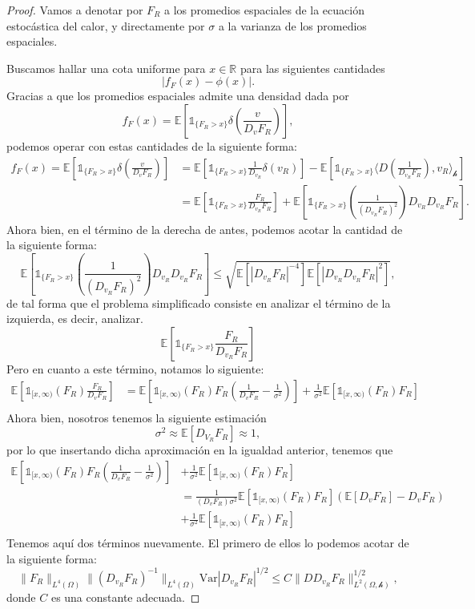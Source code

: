\documentclass[letterpaper,twoside,12pt]{book}
\newcommand{\R}{\mathbb{R}}
\newcommand{\E}{\mathbb{E}}
\newcommand{\1}{\mathds{1}}
\newcommand{\abs}[1]{\left\lvert #1 \right\rvert}
\theoremstyle{definition}
\theoremstyle{definition}
\theoremstyle{definition}
\theoremstyle{definition}
\theoremstyle{definition}
\theoremstyle{definition}
\theoremstyle{definition}
\begin{document}
\begin{proof} 
   Vamos a denotar por $F_R$ a los promedios espaciales de la ecuación estocástica del calor, y directamente por $\sigma$ a la varianza de los promedios espaciales.

   Buscamos hallar una cota uniforme para $x\in \R$ para las siguientes cantidades
   \[
   \abs{f_F(x)-\phi(x)}. 
   \]
   Gracias a que los promedios espaciales admite una densidad dada por 
   \[
   f_F(x)=\E\left[\1_{\{F_R>x\}}\delta(\frac{v}{D_vF_R})\right], 
   \]
   podemos operar con estas cantidades de la siguiente forma:
    \begin{align*}
    f_F(x)=\E\left[\1_{\{F_R>x\}}\delta(\frac{v}{D_vF_R})\right]&=\E\left[\1_{\{F_R>x\}}\frac{1}{D_{v_R}}\delta(v_R)\right]-\E\left[\1_{\{F_R>x\}}\langle D \left(\frac{1}{D_{v_R}F_R}\right),v_R\rangle_{\mathcal{h}}\right]\\
    &=\E\left[\1_{\{F_R>x\}}\frac{F_R}{D_{v_R}F_R}\right]+\E\left[\1_{\{F_R>x\}}\left(\frac{1}{\left(D_{v_R}F_R\right)^2}\right)D_{v_R}D_{v_R}F_R\right].
    \end{align*}
   Ahora bien, en el término de la derecha de antes, podemos acotar la cantidad de la siguiente forma:
   \[
    \E\left[\1_{\{F_R>x\}}\left(\frac{1}{\left(D_{v_R}F_R\right)^2}\right)D_{v_R}D_{v_R}F_R\right]\leq \sqrt{\E\left[\abs{D_{v_R}F_R}^{-4}\right]\E\left[\abs{D_{v_R}D_{v_R}F_R}^2\right]},
   \]
   de tal forma que el problema simplificado consiste en analizar el término de la izquierda, es decir, analizar.
   \[
    \E\left[\1_{\{F_R>x\}}\frac{F_R}{D_{v_R}F_R}\right] 
   \]
    Pero en cuanto a este término, notamos lo siguiente:
   \begin{align*}
    \E\left[\1_{[x,\infty)}(F_R)\frac{F_R}{D_vF_R}\right]&=\E\left[\1_{[x,\infty)}(F_R)F_R \left(\frac{1}{D_vF_R}-\frac{1}{\sigma^2}\right)\right] + \frac{1}{\sigma^2}\E\left[\1_{[x,\infty)}(F_R)F_R\right]\\
   \end{align*}
   Ahora bien, nosotros tenemos la siguiente estimación 
   \[
   \sigma^2\approx \E\left[D_{V_R}F_R\right]\approx 1,  
   \]
   por lo que insertando dicha aproximación en la igualdad anterior, tenemos que 
   \begin{align*}
    \E\left[\1_{[x,\infty)}(F_R)F_R \left(\frac{1}{D_vF_R}-\frac{1}{\sigma^2}\right)\right] &+ \frac{1}{\sigma^2}\E\left[\1_{[x,\infty)}(F_R)F_R\right]\\
    &=\frac{1}{(D_vF_R)\sigma^2}\E\left[\1_{[x,\infty)}(F_R)F_R\right] \left(\E\left[D_vF_R\right]-D_vF_R\right)\\
    &+\frac{1}{\sigma^2}\E\left[\1_{[x,\infty)}(F_R)F_R\right]\\
   \end{align*}
   Tenemos aquí dos términos nuevamente. El primero de ellos lo podemos acotar de la siguiente forma:
   \[
     \|F_R\|_{L^4(\Omega)}\|\left(D_{v_R}F_R\right)^{-1}\|_{L^{4}(\Omega)}\text{Var}\abs{D_{v_R}F_R}^{1/2}\le C\|DD_{v_R}F_R\|^{1/2}_{L^{2}(\Omega,\mathcal{h})},
   \] 
   donde $C$ es una constante adecuada.


\end{proof}
\end{document}
